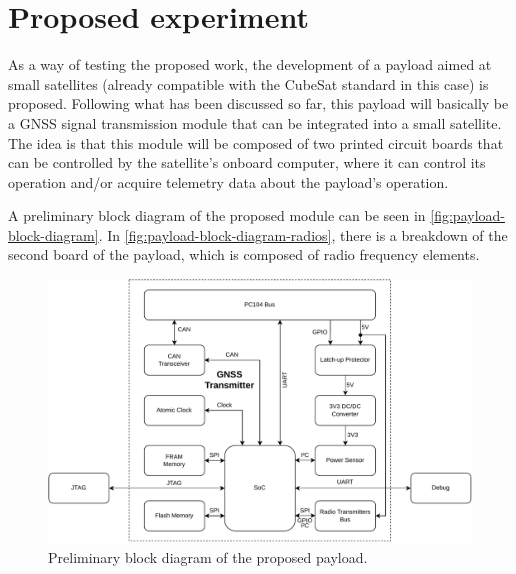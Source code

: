 \section{Proposed experiment}

As a way of testing the proposed work, the development of a payload aimed at small satellites (already compatible with the CubeSat standard in this case) is proposed. Following what has been discussed so far, this payload will basically be a GNSS signal transmission module that can be integrated into a small satellite. The idea is that this module will be composed of two printed circuit boards that can be controlled by the satellite's onboard computer, where it can control its operation and/or acquire telemetry data about the payload's operation.

A preliminary block diagram of the proposed module can be seen in \autoref{fig:payload-block-diagram}. In \autoref{fig:payload-block-diagram-radios}, there is a breakdown of the second board of the payload, which is composed of radio frequency elements.

\begin{figure}[!ht]
    \begin{center}
        \includegraphics[width=\columnwidth]{figures/block-diagram}
        \caption{Preliminary block diagram of the proposed payload.}
        \label{fig:payload-block-diagram}
    \end{center}
\end{figure}

